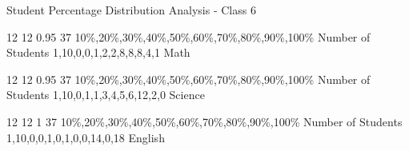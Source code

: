 \label{1.3.2 C6 Student Distribution Analysis}
    \renewcommand{\insertclass}{ - Class 6}

    \renewcommand{\insertsubject}{Math \& Science \& English}


    \begin{frame}{Student Percentage Distribution Analysis - Class 6}
    \begin{minipage}{0.285\paperwidth}
    \studentDistribution
        {12}
        {12}
        {0.95}
        {37}
        {10\%,20\%,30\%,40\%,50\%,60\%,70\%,80\%,90\%,100\%}
        {Number of Students}
        {}
        {{1},{10},{0,0,1,2,2,8,8,8,4,1}}
        {Math}
    \end{minipage}
    \begin{minipage}{0.285\paperwidth}
    \studentDistribution
        {12}
        {12}
        {0.95}
        {37}
        {10\%,20\%,30\%,40\%,50\%,60\%,70\%,80\%,90\%,100\%}
        {Number of Students}
        {}
        {{1},{10},{0,1,1,3,4,5,6,12,2,0}}
        {Science}
    \end{minipage}
    \begin{minipage}{0.285\paperwidth}
    \studentDistributionwithoutline
        {12}
        {12}
        {1}
        {37}
        {10\%,20\%,30\%,40\%,50\%,60\%,70\%,80\%,90\%,100\%}
        {Number of Students}
        {}
        {{1},{10},{0,0,1,0,1,0,0,14,0,18}}
        {English}
    \end{minipage}
    
    \end{frame}

    
    